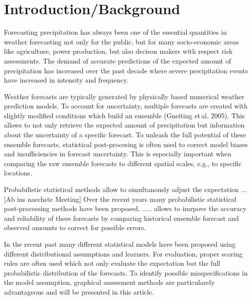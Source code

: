 \documentclass[twoside]{report}
\begin{document}

\maketitle



\section{Introduction/Background}

Forecasting precipitation has always been one of the essential quantities in
weather forecasting not only for the public, but for many socio-economic areas
like agriculture, power production, but also decison makers with respect risk
assessments. 
The demand of accurate predictions of the expected amount of precipitation has
increased over the past decade where severe precipitation events have increased
in intensity and frequency.

Weather forecasts are typically generated by physically based numerical weather
prediction models. To account for uncertainty, multiple forecasts are created
with slightly modified conditions which build an ensemble (Gneiting et\,al.
2005). This allows to not only retrieve the expected amount of precipitation
but information about the uncertainty of a specific forecast.
To unleash the full potential of these ensemble forecasts, statistical
post-procesing is often used to correct model biases and insufficiencies in
forecast uncertainty. This is especially important when comparing the raw
ensemble forecasts to different spatial scales, e.g., to specific locations.

Probabilistic statistical methods allow to simultanously adjust the
expectation 
...
[Ab ins naechste Meeting]
Over the recent years many probabilistic statistical post-processing methods
have been proposed. .....
allows to imrpove the accuracy and reliability
of these forecasts by comparing historical ensemble forecast and observed
amounts to correct for possible errors.

In the recent past many different
statistical models have been proposed using different distributional assumptions
and learners. For evaluation, proper scoring rules are often used which not
only evaluate the expectation but the full probabilistic distribution of
the forecasts. To identify possible misspecifications in the model
assumption, graphical assessment methods are particularely advantageous
and will be presented in this article.
\end{document}
